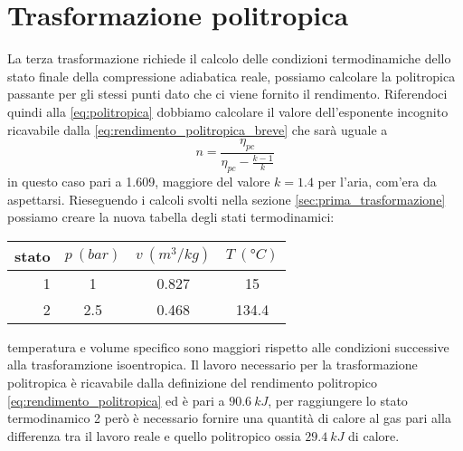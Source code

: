 \documentclass[a4paper,12pt]{article}
\begin{document}
\section{Trasformazione politropica}
\label{sec:terza_trasformazione}
La terza trasformazione richiede il calcolo delle condizioni termodinamiche dello stato finale della
compressione adiabatica reale, possiamo calcolare la politropica passante per gli stessi punti dato che
ci viene fornito il rendimento.
Riferendoci quindi alla \eqref{eq:politropica} dobbiamo calcolare il valore dell'esponente incognito
ricavabile dalla \eqref{eq:rendimento_politropica_breve} che sarà uguale a
\begin{equation}
    n = \frac{\eta_{pc}}{\eta_{pc}-\displaystyle\frac{k-1}{k}}
\end{equation}
in questo caso pari a 1.609, maggiore del valore $k = 1.4$ per l'aria, com'era da aspettarsi.
Rieseguendo i calcoli svolti nella sezione \ref{sec:prima_trasformazione} possiamo creare la nuova tabella
degli stati termodinamici:

\begin{center}
    \begin{tabular}{r|c|c|c}
        stato    & $p\ (bar)$ & $v\ (m^3/kg)$ & $T\ (\text{°}C) $\\ \hline
        1   &           1 &          0.827    &           15     \\ \hline
        2   &         2.5 &          0.468    &           134.4
    \end{tabular}
\end{center}
temperatura e volume specifico sono maggiori rispetto alle condizioni successive alla trasforamzione
isoentropica.
Il lavoro necessario per la trasformazione politropica è ricavabile dalla definizione del rendimento politropico
\eqref{eq:rendimento_politropica} ed è pari a $90.6\ kJ$, per raggiungere lo stato termodinamico 2 però
è necessario fornire una quantità di calore al gas pari alla differenza tra il lavoro reale e quello politropico
ossia $29.4\ kJ$ di calore.
\end{document}
